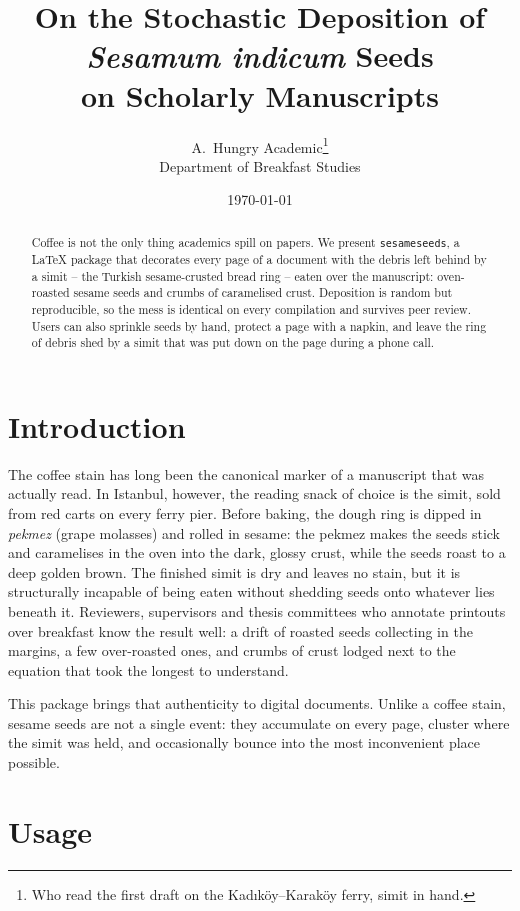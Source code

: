 \documentclass[11pt,a4paper]{article}
\title{On the Stochastic Deposition of \emph{Sesamum indicum} Seeds\\
       on Scholarly Manuscripts}
\author{A.~Hungry Academic\thanks{Who read the first draft on the
        Kadıköy--Karaköy ferry, simit in hand.}\\[2pt]
        \small Department of Breakfast Studies}
\date{\today}
\begin{document}
\maketitle

\begin{abstract}
\noindent
Coffee is not the only thing academics spill on papers. We present
\texttt{sesameseeds}, a \LaTeX{} package that decorates every page of a
document with the debris left behind by a simit -- the Turkish sesame-crusted
bread ring -- eaten over the manuscript: oven-roasted sesame seeds and
crumbs of caramelised crust. Deposition is random but reproducible, so the
mess is identical on every compilation and survives peer review. Users can
also sprinkle seeds by hand, protect a page with a napkin, and leave the ring
of debris shed by a simit that was put down on the page during a phone
call.
\end{abstract}

\section{Introduction}

The coffee stain has long been the canonical marker of a manuscript that was
actually read. In Istanbul, however, the reading snack of choice is the
simit, sold from red carts on every ferry pier. Before baking, the dough
ring is dipped in \emph{pekmez} (grape molasses) and rolled in sesame: the
pekmez makes the seeds stick and caramelises in the oven into the dark,
glossy crust, while the seeds roast to a deep golden brown. The finished
simit is dry and leaves no stain, but it is structurally incapable of being
eaten without shedding seeds onto whatever lies beneath it. Reviewers,
supervisors and thesis committees who annotate printouts over breakfast know
the result well: a drift of roasted seeds collecting in the margins, a few
over-roasted ones, and crumbs of crust lodged next to the equation that took
the longest to understand.

This package brings that authenticity to digital documents. Unlike a coffee
stain, sesame seeds are not a single event: they accumulate on every page,
cluster where the simit was held, and occasionally bounce into the most
inconvenient place possible.

\section{Usage}
\end{document}
